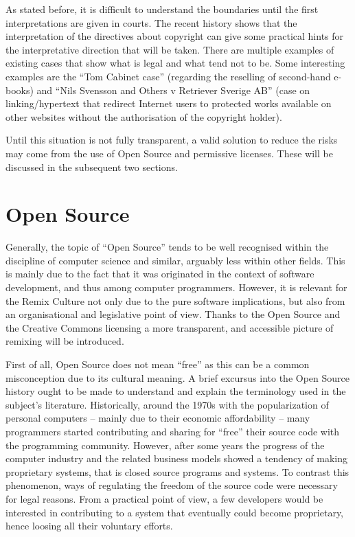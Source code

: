 As stated before, it is difficult to understand the boundaries until the first interpretations are given in courts. The recent history shows that the interpretation of the directives about copyright can give some practical hints for the interpretative direction that will be taken. There are multiple examples of existing cases that show what is legal and what tend not to be. Some interesting examples are the “Tom Cabinet case” (regarding the reselling of second-hand e-books) and “Nils Svensson and Others v Retriever Sverige AB” (case on linking/hypertext that redirect Internet users to protected works available on other websites without the authorisation of the copyright holder).

Until this situation is not fully transparent, a valid solution to reduce the risks may come from the use of Open Source and permissive licenses. These will be discussed in the subsequent two sections.

\section{Open Source}
\label{sec:OS}

Generally, the topic of “Open Source” tends to be well recognised within the discipline of computer science and similar, arguably less within other fields. This is mainly due to the fact that it was originated in the context of software development, and thus among computer programmers. However, it is relevant for the Remix Culture not only due to the pure software implications, but also from an organisational and legislative point of view. Thanks to the Open Source and the Creative Commons licensing a more transparent, and accessible picture of remixing will be introduced.

First of all, Open Source does not mean “free” as this can be a common misconception due to its cultural meaning. A brief excursus into the Open Source history ought to be made to understand and explain the terminology used in the subject’s literature.
Historically, around the 1970s with the popularization of personal computers – mainly due to their economic affordability – many programmers started contributing and sharing for “free” their source code with the programming community. However, after some years the progress of the computer industry and the related business models showed a tendency of making proprietary systems, that is closed source programs and systems.
To contrast this phenomenon, ways of regulating the freedom of the source code were necessary for legal reasons. From a practical point of view, a few developers would be interested in contributing to a system that eventually could become proprietary, hence loosing all their voluntary efforts.

